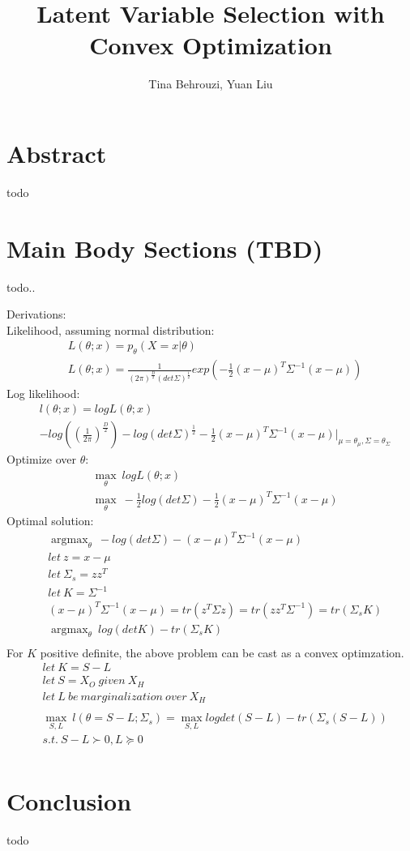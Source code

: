 \documentclass[9pt,technote]{IEEEtran}
\DeclareMathOperator*{\argmax}{argmax}
\begin{document}
\title{Latent Variable Selection with Convex Optimization}
\author{Tina Behrouzi, Yuan Liu}

\maketitle

\section*{Abstract}
todo\\
\vfill\null

\section*{Main Body Sections (TBD)}
todo..\\
\vfill\null

Derivations:\\
Likelihood, assuming normal distribution:
\begin{align*}
  &L(\theta;x) = p_{\theta}(X=x | \theta)\\
  &L(\theta;x) = \frac{1}{(2\pi)^{\frac{D}{2}} (det \Sigma)^{\frac{1}{2}}} exp(-\frac{1}{2}(x-\mu)^T\Sigma^{-1}(x-\mu))
\end{align*}
Log likelihood:
\begin{align*}
  & l(\theta;x) = log L(\theta;x)\\
  & -log((\frac{1}{2 \pi})^{\frac{D}{2}}) - log(det \Sigma)^{\frac{1}{2}} - \frac{1}{2}(x-\mu)^T \Sigma^{-1}(x-\mu) \bigg|_{\mu=\theta_{\mu}, \Sigma=\theta_{\Sigma}}
\end{align*}
Optimize over $\theta$:
\begin{align*}
  & \max_{\theta}\ log L(\theta;x)\\
  & \max_{\theta}\ - \frac{1}{2} log(det \Sigma) - \frac{1}{2}(x-\mu)^T \Sigma^{-1}(x-\mu)
\end{align*}
Optimal solution:
\begin{align*}
  & \argmax_{\theta}\ -log(det \Sigma) - (x-\mu)^T \Sigma^{-1}(x-\mu)\\
  &let\ z= x-\mu\\
  &let\ \Sigma_{s}= zz^T\\
  &let\ K = \Sigma^{-1}\\
  &(x-\mu)^T \Sigma^{-1}(x-\mu) = tr(z^T \Sigma z) = tr(zz^T \Sigma^{-1}) = tr(\Sigma_{s} K)\\
  & \argmax_{\theta}\ log(det K) - tr(\Sigma_{s} K)\\
\end{align*}
For $K$ positive definite, the above problem can be cast as a convex optimzation.
\begin{align*}
  &let\ K=S-L\\
  &let\ S = X_O\ given\ X_H\\
  &let\ L\ be\ marginalization\ over\ X_H\\
  \\
  &\max_{S,L}\ l(\theta=S-L; \Sigma_{s}) = \max_{S,L} log det(S-L) - tr(\Sigma_{s}(S-L))\\
  &s.t.\ S-L \succ 0, L \succeq 0\\
\end{align*}

\vfill\null
\pagebreak

\section*{Conclusion}
todo
\end{document}

